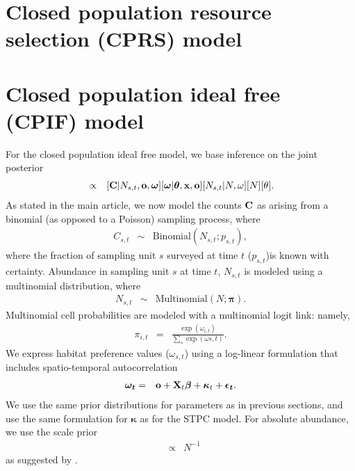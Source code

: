 \documentclass[12pt,fleqn]{article}
\begin{document}
\begin{flushleft}
\section{Closed population resource selection (CPRS) model}


\section{Closed population ideal free (CPIF) model}

For the closed population ideal free model, we base inference on the joint posterior
\begin{eqnarray}
  [N, N_{s,t}, \boldsymbol{\omega},\boldsymbol{\theta} | {\bf x},{\bf C},{\bf o},{\bf p}] & \propto & [{\bf C} | N_{s,t}, {\bf o}, \boldsymbol{\omega}] [\boldsymbol{\omega} | \boldsymbol{\theta},{\bf x},{\bf o}] [N_{s,t}|N,\omega] [N] [\theta].
  \label{eq:cpif-post}
\end{eqnarray}
As stated in the main article, we now model the counts ${\bf C}$ as arising from a binomial (as opposed to a Poisson) sampling process, where
\begin{eqnarray*}
  C_{s,t} & \sim & \textrm{Binomial}(N_{s,t}; p_{s,t}),
\end{eqnarray*}
where the fraction of sampling unit $s$ surveyed at time $t$ ($p_{s,t}$)is known with certainty.  Abundance in sampling unit $s$ at time $t$, $N_{s,t}$ is modeled using a multinomial distribution, where
\begin{eqnarray*}
  N_{s,t} & \sim & \textrm{Multinomial}(N; \boldsymbol{\pi}).
\end{eqnarray*}
Multinomial cell probabilities are modeled with a multinomial logit link: namely,
\begin{eqnarray*}
  \pi_{i,t} & = & \frac{\exp(\omega_{i,t})}{\sum_s \exp(\omega{s,t})}.
\end{eqnarray*}
We express habitat preference values ($\omega_{s,t}$) using a log-linear formulation that includes spatio-temporal autocorrelation
\begin{eqnarray*}
  \boldsymbol{\omega_t} & = & {\bf o} + {\bf X}_t \boldsymbol{\beta} + \boldsymbol{\kappa}_t + \boldsymbol{\epsilon_t}.
\end{eqnarray*}
We use the same prior distributions for parameters as in previous sections, and use the same formulation for $\boldsymbol{\kappa}$ as for the STPC model.  For absolute abundance, we use the scale prior
\begin{eqnarray*}
[N] & \propto & N^{-1}
\end{eqnarray*}
as suggested by \citet{Link2013}.


\end{flushleft}
\end{document}
